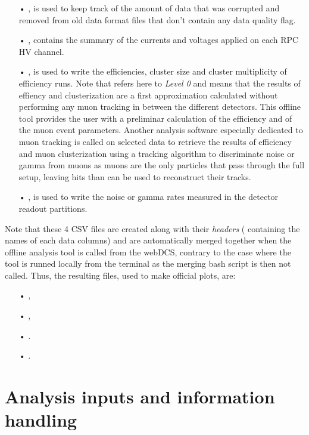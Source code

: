 	\begin{itemize}
		\item[•]  , is used to keep track of the amount of data that was corrupted and removed from old data format files that don't contain any data quality flag.
		\item[•]  , contains the summary of the currents and voltages applied on each RPC HV channel.
		\item[•]  , is used to write the efficiencies, cluster size and cluster multiplicity of efficiency runs. Note that  refers here to \textit{Level 0} and means that the results of effiency and clusterization are a first approximation calculated without performing any muon tracking in between the different detectors. This offline tool provides the user with a preliminar calculation of the efficiency and of the muon event parameters. Another analysis software especially dedicated to muon tracking is called on selected data to retrieve the results of efficiency and muon clusterization using a tracking algorithm to discriminate noise or gamma from muons as muons are the only particles that pass through the full setup, leaving hits than can be used to reconstruct their tracks.
		\item[•]  , is used to write the noise or gamma rates measured in the detector readout partitions.
	\end{itemize}
	
	Note that these 4 CSV files are created along with their \textit{headers} ( containing the names of each data columns) and are automatically merged together when the offline analysis tool is called from the webDCS, contrary to the case where the tool is runned locally from the terminal as the merging bash script is then not called. Thus, the resulting files, used to make official plots, are:

	\begin{itemize}
		\item[•]  ,
		\item[•]  ,
		\item[•]  .
		\item[•]  .
	\end{itemize}
	
\section{Analysis inputs and information handling}
\label{app2:sec:inputs}
	
